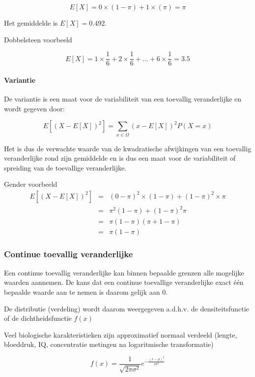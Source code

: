 \documentclass[
  12pt,dutch,coursenotes]{book}
\theoremstyle{definition}
\theoremstyle{definition}
\theoremstyle{definition}
\theoremstyle{definition}
\theoremstyle{remark}
\begin{document}
\[E[X]= 0 \times (1-\pi) + 1 \times (\pi) = \pi\]

Het gemiddelde is \(E[X]=0.492\).

Dobbelsteen voorbeeld

\[E[X]= 1 \times \frac{1}{6} + 2 \times \frac{1}{6} + \ldots + 6 \times \frac{1}{6} = 3.5\]

\hypertarget{variantie}{%
\paragraph{Variantie}\label{variantie}}

De variantie is een maat voor de variabiliteit van een toevallig veranderlijke en wordt gegeven door:

\[E[(X-E[X])^2]=\sum\limits_{x\in\Omega} (x-E[X])^2 P(X=x)\]

Het is dus de verwachte waarde van de kwadratische afwijkingen van een toevallig veranderlijke rond zijn gemiddelde en is dus een maat voor de variabiliteit of spreiding van de toevallige veranderlijke.

Gender voorbeeld
\begin{eqnarray}
    E[(X-E[X])^2]&=&(0-\pi)^2\times (1-\pi)+(1-\pi)^2 \times \pi\\
    &=& \pi^2 (1-\pi) + (1-\pi)^2 \pi\\
    &=&\pi (1-\pi)(\pi+1-\pi)\\
    &=&\pi(1-\pi)
    \end{eqnarray}

\hypertarget{continue-toevallig-veranderlijke}{%
\subsubsection{Continue toevallig veranderlijke}\label{continue-toevallig-veranderlijke}}

Een continue toevallig veranderlijke kan binnen bepaalde grenzen alle mogelijke waarden aannemen. De kans dat een continue toevallige veranderlijke exact één bepaalde waarde aan te nemen is daarom gelijk aan 0.

De distributie (verdeling) wordt daarom weergegeven a.d.h.v. de densiteitsfunctie of de dichtheidsfunctie \(f(x)\)

Veel biologische karakteristieken zijn approximatief normaal verdeeld (lengte, bloeddruk, IQ, concentratie metingen na logaritmische transformatie)

\[f(x) = \frac{1}{\sqrt{2\pi\sigma^2}} e^{-\frac{(x-\mu)^2}{2\sigma^2}}\]
\end{document}
